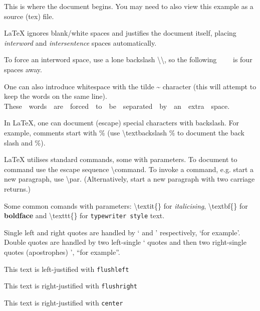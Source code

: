 \documentclass{sample}
\begin{document}
This is where the document begins. You may need to also view this example as a source (tex) file.

LaTeX ignores blank/white spaces and justifies the document itself, placing \textit{interword} and \textit{intersentence} spaces automatically. 

To force an interword space, use a lone backslash \textbackslash \textbackslash, so the following \ \ \ \ is four spaces away. 

One can also introduce whitespace with the tilde \~{} character (this will attempt to keep the words on the same line). These~~words~~are~~forced~~to~~be~~separated~~by~~an~~extra~~space.

In LaTeX, one can document (escape) special characters with backslash. For example, comments start with \% (use \textbackslash textbackslash \% to document the back slash and \%).

LaTeX utilises standard commands, some with parameters. To document to command use the escape sequence \textbackslash command. To invoke a command, e.g. start a new paragraph, use \textbackslash par. (Alternatively, start a new paragraph with two carriage returns.)

Some common comands with parameters: \textbackslash textit\{\} for \textit{italicising}, \textbackslash textbf\{\} for \textbf{boldface} and \textbackslash texttt\{\} for \texttt{typewriter style} text.

Single left and right quotes are handled by ` and ' respectively, `for example'. Double quotes are handled by two left-single ` quotes  and then two right-single quotes (apostrophes) ', ``for example''.

\begin{flushleft}
This text is left-justified with \texttt{flushleft} 
\end{flushleft}

\begin{flushright}
This text is right-justified with \texttt{flushright} 
\end{flushright}

\begin{center}
This text is right-justified with \texttt{center} 
\end{center}
\end{document}
